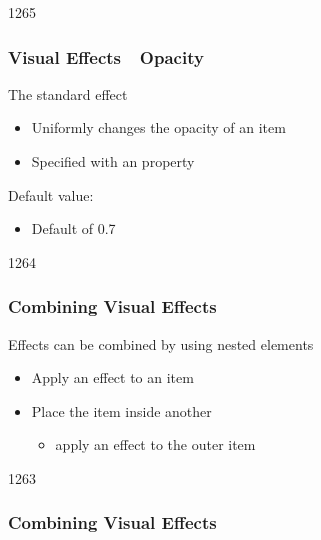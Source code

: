 \begin{slide}{1265}\frametitle{Visual Effects~\textendash~Opacity}

The standard  effect

\begin{itemize}
\item Uniformly changes the opacity of an item
\item Specified with an  property
\end{itemize}

\vspace*{0.5em}

\vspace*{1em}
Default value:

\begin{itemize}
\item Default  of 0.7
\end{itemize}

\end{slide}


\begin{slide}{1264}\frametitle{Combining Visual Effects}

Effects can be combined by using nested elements

\begin{itemize}
\item Apply an effect to an item
\item Place the item inside another
  \begin{itemize}
  \item apply an effect to the outer item
  \end{itemize}
\end{itemize}

\end{slide}


\begin{slide}{1263}\frametitle{Combining Visual Effects}




\end{slide}

